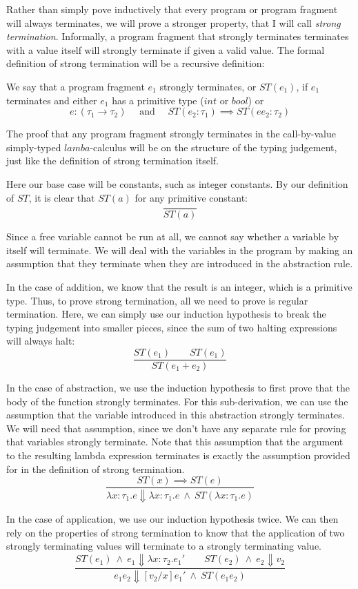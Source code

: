 \documentclass{article}
\begin{document}
Rather than simply pove inductively that every program or program fragment will
always terminates, we will prove a stronger property, that I will call
\emph{strong termination}.  Informally, a program fragment that strongly
terminates terminates with a value itself will strongly terminate if given a
valid value.  The formal definition of strong termination will be a recursive
definition:

We say that a program fragment $e_1$ strongly terminates, or $ST(e_1)$, if
$e_1$ terminates and either $e_1$ has a primitive type ($int$ or $bool$)
or
\[
e : (\tau_1 \to \tau_2) \quad \text{ and }
\quad ST(e_2: \tau_1) \implies ST(e e_2 : \tau_2)
\]

The proof that any program fragment strongly terminates in the call-by-value
simply-typed $lamba$-calculus will be on the structure of the typing judgement,
just like the definition of strong termination itself.

Here our base case will be constants, such as integer constants.
By our definition of $ST$, it is clear that $ST(a)$ for any primitive constant:
\[
\frac{}{ST(a)}
\]

Since a free variable cannot be run at all, we cannot say whether a variable
by itself will terminate.  We will deal with the variables in the program by 
making an assumption that they terminate when they are introduced in the
abstraction rule.

In the case of addition, we know that the result is an integer, which is a
primitive type.  Thus, to prove strong termination, all we need to prove is
regular termination. Here, we can simply use our induction hypothesis
to break the typing judgement into smaller pieces, since the sum of two halting
expressions will always halt:
\[
\frac{ST(e_1) \qquad ST(e_1)}
{ST(e_1 + e_2)}
\]

In the case of abstraction, we use the induction hypothesis to first prove that
the body of the function strongly terminates.  For this sub-derivation, we can
use the assumption that the variable introduced in this abstraction strongly
terminates.  We will need that assumption, since we don't have any separate
rule for proving that variables strongly terminate.
Note that this assumption that the argument to the resulting lambda expression
terminates is exactly the assumption provided for in the definition of strong
termination.
\[
\frac{ST(x) \implies ST(e)}
{\lambda x:\tau_1. e \Downarrow \lambda x:\tau_1. e
\ \wedge\ ST(\lambda x:\tau_1.e) }
\]

In the  case of application, we use our induction hypothesis twice.  We can
then rely on the properties of strong termination to know that the application
of two strongly terminating values will terminate to a strongly terminating
value.
\[
\frac{ST(e_1)\ \wedge\ e_1 \Downarrow \lambda x:\tau_2. e_1'
\qquad
ST(e_2)\ \wedge\ e_2 \Downarrow v_2 }
{e_1 e_2 \Downarrow [v_2/x]e_1' \ \wedge\ ST(e_1 e_2)}
\]
\end{document}
